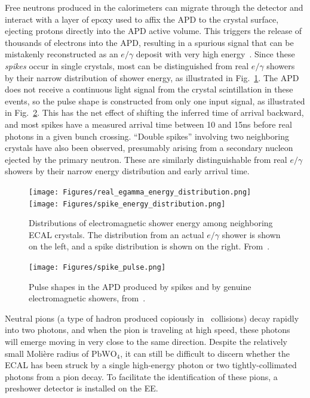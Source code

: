 Free neutrons produced in the calorimeters can migrate through the detector and interact with a layer of epoxy used to affix the APD
to the crystal surface, ejecting protons directly into the APD active volume. This triggers the release of thousands of electrons into the APD,
resulting in a spurious signal that can be mistakenly reconstructed as an $e/\gamma$ deposit with very high energy~\cite{ref:1742-6596/404/1/012043}.
Since these \textit{spikes} occur in single crystals, most can be distinguished from real $e/\gamma$ showers by their narrow distribution of shower energy,
as illustrated in Fig.~\ref{fig:spike_energy_distribution}.
The APD does not receive a continuous light signal from the crystal scintillation in these events, so the pulse shape is constructed from
only one input signal, as illustrated in Fig.~\ref{fig:spike_pulse_shape}. This has the net effect of shifting the inferred time of arrival backward, and most spikes have a measured arrival time between 10 and 15\unit{ns}
before real photons in a given bunch crossing. ``Double spikes'' involving two neighboring crystals have also been observed, presumably
arising from a secondary nucleon ejected by the primary neutron. These are similarly distinguishable from real $e/\gamma$ showers by their narrow
energy distribution and early arrival time.

\begin{figure}[hbtp]
  \begin{center}
    \texttt{[image: Figures/real\_egamma\_energy\_distribution.png]}
    \texttt{[image: Figures/spike\_energy\_distribution.png]}
    \caption{Distributions of electromagnetic shower energy among neighboring ECAL crystals. The distribution from an actual
    $e/\gamma$ shower is shown on the left, and a spike distribution is shown on the right. From~\cite{ref:spikes_farzanehfar}.}
    \label{fig:spike_energy_distribution}
  \end{center}
\end{figure}

\begin{figure}[hbtp]
  \begin{center}
    \texttt{[image: Figures/spike\_pulse.png]}
    \caption{Pulse shapes in the APD produced by spikes and by genuine electromagnetic showers, from~\cite{ref:DN-2015/014}.}
    \label{fig:spike_pulse_shape}
  \end{center}
\end{figure}

Neutral pions (a type of hadron produced copiously in \Pp\Pp\ collisions) decay rapidly into two photons,
and when the pion is traveling at high speed, these photons will emerge moving in very close to the same direction.
Despite the relatively small Molière radius of $\mathrm{PbWO}_{4}$, it can still be difficult to discern whether the ECAL
has been struck by a single high-energy photon or two tightly-collimated photons from a pion decay.
To facilitate the identification of these pions, a preshower detector is installed on the EE.

